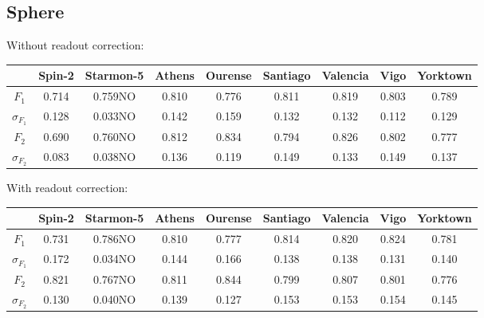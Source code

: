 \subsection{Sphere}
Without readout correction:
\begin{table}[H]
    \centering
    \begin{tabular}{|c|c|c|c|c|c|c|c|c|}
    \hline
    \textbf{} & \textbf{Spin-2} & \textbf{Starmon-5} & \textbf{Athens} & \textbf{Ourense} & \textbf{Santiago} & \textbf{Valencia} & \textbf{Vigo} & \textbf{Yorktown} \\ \hline
    $F_1$              & 0.714  & 0.759NO & 0.810 & 0.776 & 0.811 & 0.819 & 0.803 & 0.789 \\ \hline
    $\sigma_{F_1}$     & 0.128  & 0.033NO & 0.142 & 0.159 & 0.132 & 0.132 & 0.112 & 0.129 \\ \hline
    $F_2$              & 0.690  & 0.760NO & 0.812 & 0.834 & 0.794 & 0.826 & 0.802 & 0.777 \\ \hline
    $\sigma_{F_2}$     & 0.083  & 0.038NO & 0.136 & 0.119 & 0.149 & 0.133 & 0.149 & 0.137 \\ \hline
    \end{tabular}
\end{table}

With readout correction:
\begin{table}[H]
    \centering
    \begin{tabular}{|c|c|c|c|c|c|c|c|c|}
    \hline
    \textbf{} & \textbf{Spin-2} & \textbf{Starmon-5} & \textbf{Athens} & \textbf{Ourense} & \textbf{Santiago} & \textbf{Valencia} & \textbf{Vigo} & \textbf{Yorktown} \\ \hline
    $F_1$              & 0.731 & 0.786NO & 0.810 & 0.777 & 0.814 & 0.820 & 0.824 & 0.781 \\ \hline
    $\sigma_{F_1}$     & 0.172 & 0.034NO & 0.144 & 0.166 & 0.138 & 0.138 & 0.131 & 0.140 \\ \hline
    $F_2$              & 0.821 & 0.767NO & 0.811 & 0.844 & 0.799 & 0.807 & 0.801 & 0.776 \\ \hline
    $\sigma_{F_2}$     & 0.130 & 0.040NO & 0.139 & 0.127 & 0.153 & 0.153 & 0.154 & 0.145 \\ \hline
    \end{tabular}
\end{table}

